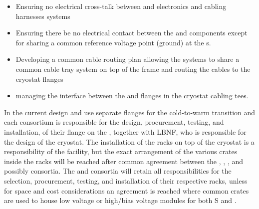 \begin{itemize}
    \item Ensuring no electrical cross-talk between  and  electronics and cabling harnesses systems
    \item Ensuring there be no electrical contact between the  and  components except for sharing a common reference voltage point (ground) at the \fdth{}s.
    \item Developing a common cable routing plan allowing the systems to share a common cable tray system on top of the  frame and routing the cables to the cryostat flanges



    \item managing the interface between the  and  flanges in the cryostat cabling tees.
  
  \end{itemize}  
In the current design  and  use separate flanges for the cold-to-warm transition and each consortium is responsible for the design, procurement, testing, and installation, of their flange on the \fdth{}, together with LBNF, who is responsible for the design of the cryostat. 
The installation of the racks on top of the cryostat is a responsibility of the facility, but the exact arrangement of the various crates inside the racks will be reached after common agreement between the , , , and possibly  consortia. The  and  consortia will retain all responsibilities for the selection, procurement, testing, and installation of their respective racks, unless for space and cost considerations an agreement is reached where common crates are used to house low voltage or high/bias voltage modules for both S and . 

